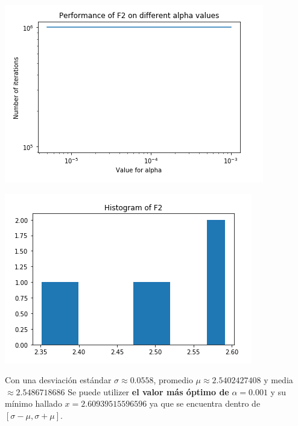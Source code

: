 \documentclass[10pt,letterpaper]{article}
\begin{document}
\begin{enumerate}
\begin{enumerate}
                    \begin{multicols}{2}
                        \begin{center}
                            \includegraphics[scale=.45]{assets/theory/1-b/f2-performance.png}
                        \end{center}
                        \begin{center}
                            \includegraphics[scale=.45]{assets/theory/1-b/f2-dist.png}
                        \end{center}
                    \end{multicols}

                    Con una desviación estándar $\sigma \approx 0.0558$,
                    promedio $\mu \approx 2.5402427408$ y media $\approx 2.5486718686$
                    Se puede utilizer \textbf{el valor más óptimo de} $\alpha = 0.001$ y
                    su mínimo hallado $x=2.60939515596596$ ya que se encuentra dentro de
                    $[\sigma - \mu, \sigma + \mu]$.


\end{enumerate}
\end{enumerate}
\end{document}
